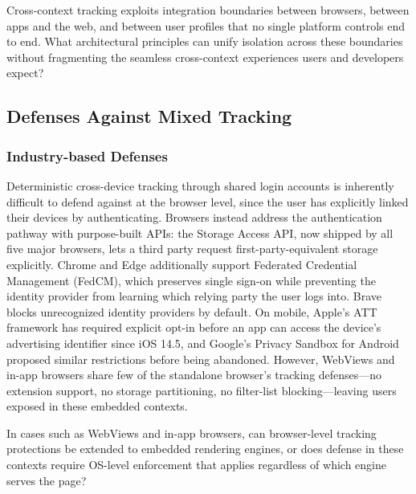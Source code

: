 \begin{opbox}
Cross-context tracking exploits integration boundaries between browsers, between apps and the web, and between user profiles that no single platform controls end to end. What architectural principles can unify isolation across these boundaries without fragmenting the seamless cross-context experiences users and developers expect?
\end{opbox}





\subsection{Defenses Against Mixed Tracking}
\label{sec:mixed-defenses}


\subsubsection{Industry-based Defenses}
\label{sec:mixed-defenses-industry}


%
Deterministic cross-device tracking through shared login accounts is inherently difficult to defend against at the browser level, since the user has explicitly linked their devices by authenticating.
%
Browsers instead address the authentication pathway with purpose-built APIs: the Storage Access API, now shipped by all five major browsers, lets a third party request first-party-equivalent storage explicitly. Chrome and Edge additionally support Federated Credential Management (FedCM), which preserves single sign-on while preventing the identity provider from learning which relying party the user logs into. Brave blocks unrecognized identity providers by default.
%
On mobile, Apple's ATT framework has required explicit opt-in before an app can access the device's advertising identifier since iOS 14.5, and Google's Privacy Sandbox for Android proposed similar restrictions before being abandoned.
%
However, WebViews and in-app browsers share few of the standalone browser's tracking defenses---no extension support, no storage partitioning, no filter-list blocking---leaving users exposed in these embedded contexts.

\begin{opbox}
In cases such as WebViews and in-app browsers, can browser-level tracking protections be extended to embedded rendering engines, or does defense in these contexts require OS-level enforcement that applies regardless of which engine serves the page?
\end{opbox}


